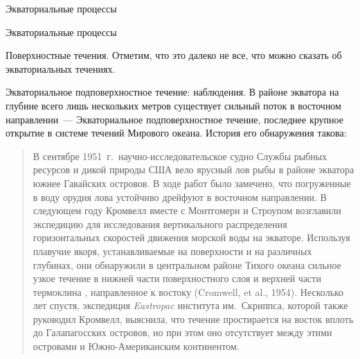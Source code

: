 \begin{chapter}{Экваториальные процессы}
\begin{section}{Экваториальные процессы}
\begin{paragraph}{Поверхностные течения.}
Отметим, что это далеко не все, что можно сказать об экваториальных течениях.
%
\end{paragraph}

\begin{paragraph}{Экваториальное подповерхностное течение: наблюдения.}
%
В районе экватора на глубине всего лишь нескольких метров существует
сильный поток в восточном направлении~--- Экваториальное
подповерхностное течение, последнее крупное открытие в системе течений 
Мирового океана. История его обнаружения такова:
%
\begin{quotation}
В сентябре 1951~г.\ научно-исследовательское судно Службы рыбных ресурсов 
и дикой природы США вело ярусный лов рыбы в районе экватора южнее Гавайских 
островов. В ходе работ было замечено, что погруженные в воду орудия лова 
устойчиво дрейфуют в восточном направлении. В следующем году Кромвелл вместе 
с Монтгомери и Строупом возглавили экспедицию для исследования вертикального 
распределения горизонтальных скоростей движения морской воды на экваторе. 
Используя плавучие якоря, устанавливаемые на поверхности и на различных 
глубинах, они обнаружили в центральном районе Тихого океана сильное узкое
течение в нижней части поверхностного слоя и верхней части термоклина
, 
направленное к востоку (Cromwell, et al., 1954). Несколько лет спустя,
экспедиция \textit{Eastropac} института им.~Скриппса, которой также
руководил Кромвелл, выяснила, что течение простирается на восток вплоть 
до Галапагосских островов, но при этом оно отсутствует
между этими островами и Южно-Американским континентом.
%


\end{quotation}
\end{paragraph}
\end{section}
\end{chapter}
